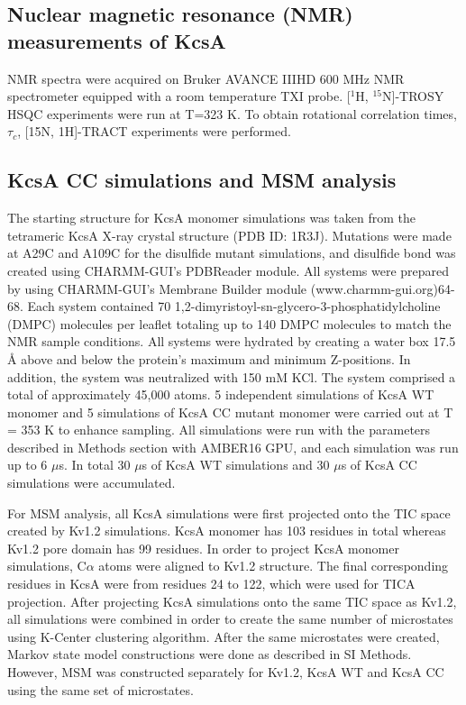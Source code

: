 \subsection{Nuclear magnetic resonance (NMR) measurements of KcsA}
NMR spectra were acquired on Bruker AVANCE IIIHD 600 MHz NMR spectrometer equipped with a room temperature TXI probe. [$^{1}$H, $^{15}$N]-TROSY HSQC experiments were run at T=323 K. To obtain rotational correlation times, $\tau_{c}$, [15N, 1H]-TRACT experiments were performed. \citep{lee2006, cavanagh2007, cho1999, nesg2011, pond2012} 

\subsection{KcsA CC simulations and MSM analysis}
The starting structure for KcsA monomer simulations was taken from the tetrameric KcsA X-ray crystal structure (PDB ID: 1R3J). Mutations were made at A29C and A109C for the disulfide mutant simulations, and disulfide bond was created using CHARMM-GUI’s PDBReader module. All systems were prepared by using CHARMM-GUI’s Membrane Builder module (www.charmm-gui.org)64-68. Each system contained 70 1,2-dimyristoyl-sn-glycero-3-phosphatidylcholine (DMPC) molecules per leaflet totaling up to 140 DMPC molecules to match the NMR sample conditions. All systems were hydrated by creating a water box 17.5 Å above and below the protein’s maximum and minimum Z-positions. In addition, the system was neutralized with 150 mM KCl. The system comprised a total of approximately 45,000 atoms. 5 independent simulations of KcsA WT monomer and 5 simulations of KcsA CC mutant monomer were carried out at T = 353 K to enhance sampling. All simulations were run with the parameters described in Methods section with AMBER16 GPU, and each simulation was run up to 6 $\mu$s. In total 30 $\mu$s of KcsA WT simulations and 30 $\mu$s of KcsA CC simulations were accumulated.

For MSM analysis, all KcsA simulations were first projected onto the TIC space created by Kv1.2 simulations. KcsA monomer has 103 residues in total whereas Kv1.2 pore domain has 99 residues. In order to project KcsA monomer simulations, C$\alpha$ atoms were aligned to Kv1.2 structure. The final corresponding residues in KcsA were from residues 24 to 122, which were used for TICA projection. After projecting KcsA simulations onto the same TIC space as Kv1.2, all simulations were combined in order to create the same number of microstates using K-Center clustering algorithm. After the same microstates were created, Markov state model constructions were done as described in SI Methods. However, MSM was constructed separately for Kv1.2, KcsA WT and KcsA CC using the same set of microstates.

